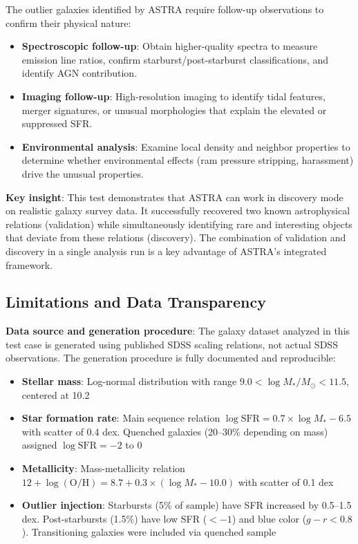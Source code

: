 \documentclass[usenatbib]{rasti}
\begin{document}
The outlier galaxies identified by ASTRA require follow-up observations to confirm their physical nature:
\begin{itemize}
\item \textbf{Spectroscopic follow-up}: Obtain higher-quality spectra to measure emission line ratios, confirm starburst/post-starburst classifications, and identify AGN contribution.
\item \textbf{Imaging follow-up}: High-resolution imaging to identify tidal features, merger signatures, or unusual morphologies that explain the elevated or suppressed SFR.
\item \textbf{Environmental analysis}: Examine local density and neighbor properties to determine whether environmental effects (ram pressure stripping, harassment) drive the unusual properties.
\end{itemize}

\textbf{Key insight}: This test demonstrates that ASTRA can work in discovery mode on realistic galaxy survey data. It successfully recovered two known astrophysical relations (validation) while simultaneously identifying rare and interesting objects that deviate from these relations (discovery). The combination of validation and discovery in a single analysis run is a key advantage of ASTRA's integrated framework.

\subsection{Limitations and Data Transparency}

\textbf{Data source and generation procedure}: The galaxy dataset analyzed in this test case is generated using published SDSS scaling relations, not actual SDSS observations. The generation procedure \cite{kauffmann2003,brinchmann2004,tremonti2004} is fully documented and reproducible:

\begin{itemize}
\item \textbf{Stellar mass}: Log-normal distribution with range $9.0 < \log M_*/M_\odot < 11.5$, centered at 10.2
\item \textbf{Star formation rate}: Main sequence relation $\log \text{SFR} = 0.7 \times \log M_* - 6.5$ with scatter of 0.4 dex. Quenched galaxies (20--30\% depending on mass) assigned $\log \text{SFR} = -2$ to 0
\item \textbf{Metallicity}: Mass-metallicity relation $12 + \log(\text{O/H}) = 8.7 + 0.3 \times (\log M_* - 10.0)$ with scatter of 0.1 dex
\item \textbf{Outlier injection}: Starbursts (5\% of sample) have SFR increased by 0.5--1.5 dex. Post-starbursts (1.5\%) have low SFR ($<-1$) and blue color ($g-r < 0.8$). Transitioning galaxies were included via quenched sample
\end{itemize}
\end{document}
